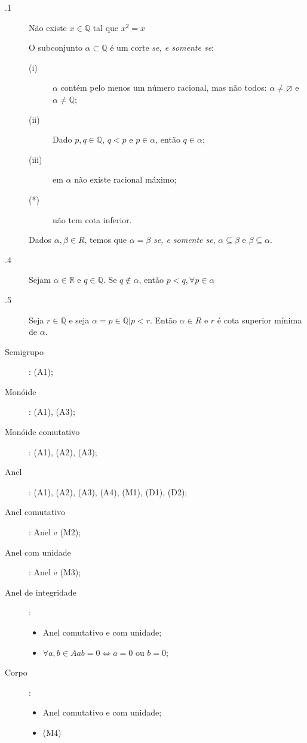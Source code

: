 \documentclass[11pt]{article}
\newcommand{\Q}{\mathbb{Q}}
\newcommand{\R}{\mathbb{R}}
\begin{document}
\noindent{\Large \bf 5. Números Reais - $\R$}

\begin{description}
  \item[.1] Não existe $x \in \Q$ tal que $x^2 = x$
  \item[] O subconjunto $\alpha \subset \Q$ é um corte \emph{se,
    e somente se}:
    \begin{description}
      \item[(i)] $\alpha$ contém pelo menos um número racional, mas não todos:
        $\alpha \neq \varnothing$ e $\alpha \neq \Q$;
      \item[(ii)] Dado $p,q \in \Q$, $q < p$ e $p \in \alpha$, então $q
        \in \alpha$;
      \item[(iii)] em $\alpha$ não existe racional máximo;
      \item[(*)] não tem cota inferior.
    \end{description}
  \item[\obse] Dados $\alpha, \beta \in R$, temos que $\alpha = \beta$
    \emph{se, e somente se}, $\alpha \subseteq \beta$ e $\beta \subseteq
    \alpha$.
  \item[.4] Sejam $\alpha \in \R$ e $q \in \Q$. Se $q
    \notin \alpha$, então $p < q, \forall p \in \alpha$
  \item[.5] Seja $r \in \Q$ e seja $\alpha = { p \in \Q
    | p < r}$. Então $\alpha \in R$ e $r$ é cota superior mínima de $\alpha$.
\end{description}


\begin{description}
  \item[Semigrupo]: (A1);
  \item[Monóide]: (A1), (A3);
  \item[Monóide comutativo]: (A1), (A2), (A3);
  \item[Anel]: (A1), (A2), (A3), (A4), (M1), (D1), (D2);
  \item[Anel comutativo]: Anel e (M2);
  \item[Anel com unidade]: Anel e (M3);
  \item[Anel de integridade]:
    \begin{itemize}
      \item Anel comutativo e com unidade;
      \item $\forall a,b \in A ab=0 \iff a=0$ ou $b=0$;
    \end{itemize}
  \item[Corpo]:
    \begin{itemize}
      \item Anel comutativo e com unidade;
      \item (M4)
    \end{itemize}
\end{description}
\end{document}
